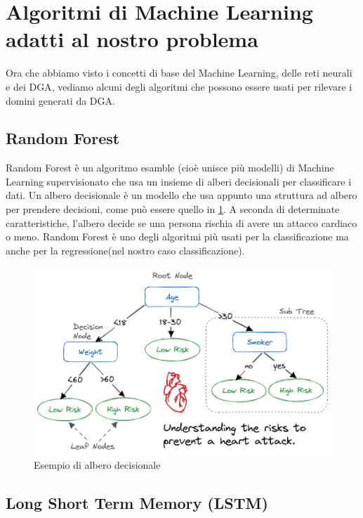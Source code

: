 \documentclass[12pt,a4paper,openright,twoside]{book}
\begin{document}
\section{Algoritmi di Machine Learning adatti al nostro problema}

Ora che abbiamo visto i concetti di base del Machine Learning, delle reti neurali
e dei \acrshort{DGA}, vediamo alcuni degli algoritmi che possono essere usati
per rilevare i domini generati da \acrshort{DGA}.

\subsection{Random Forest}

Random Forest è un algoritmo esamble (cioè unisce più modelli) di Machine Learning supervisionato che usa un insieme di alberi decisionali
per classificare i dati. Un albero decisionale è un modello che usa appunto una struttura ad albero
per prendere decisioni, come può essere quello in \ref{fig:decision tree}. A seconda di determinate
caratteristiche, l'albero decide se una persona rischia di avere un attacco cardiaco o meno.
Random Forest è uno degli algoritmi più usati per la classificazione ma anche per la regressione(nel nostro caso
classificazione).





\begin{figure}
    \centering
    \includegraphics[width=.8\linewidth]{figures/Decision_tree_for_heart_attack.png}
    \caption{Esempio di albero decisionale \cite{decision_tree_image}}
    \label{fig:decision tree}
\end{figure}

\subsection{Long Short Term Memory (LSTM)}
\end{document}
